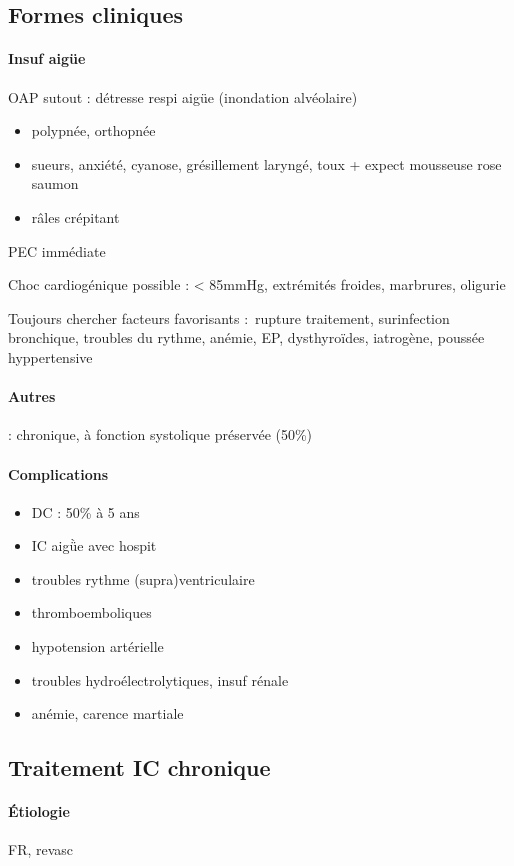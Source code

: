 \subsection{Formes cliniques}
\paragraph{ Insuf aigüe}
OAP sutout : détresse respi aigüe (inondation alvéolaire) 
\begin{itemize}
  \item polypnée, orthopnée
  \item sueurs, anxiété, cyanose, grésillement laryngé, toux + expect mousseuse
    rose saumon
  \item râles crépitant
\end{itemize}
\thus PEC immédiate \skull
   
Choc cardiogénique possible : < 85mmHg, extrémités froides, marbrures, oligurie

Toujours chercher facteurs favorisants : rupture traitement, surinfection
bronchique, troubles du rythme, anémie, EP, dysthyroïdes, iatrogène, poussée
hyppertensive

\paragraph{Autres} : chronique, à fonction systolique préservée (50\%)

\paragraph{Complications}
\begin{itemize}
  \item DC : 50\% à 5 ans
  \item IC aigǜe avec hospit
  \item troubles rythme (supra)ventriculaire
  \item thromboemboliques
  \item hypotension artérielle
  \item troubles hydroélectrolytiques, insuf rénale
  \item anémie, carence martiale
\end{itemize}

\subsection{Traitement IC chronique}
\paragraph{Étiologie}
FR, revasc

